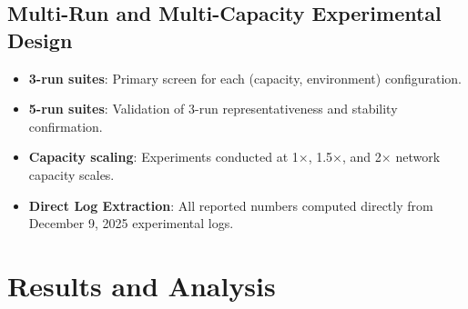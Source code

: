 \documentclass[12pt,a4paper]{article}
\begin{document}
\subsection{Multi-Run and Multi-Capacity Experimental Design}
\begin{itemize}
\item \textbf{3-run suites}: Primary screen for each (capacity, environment) configuration.
\item \textbf{5-run suites}: Validation of 3-run representativeness and stability confirmation.
\item \textbf{Capacity scaling}: Experiments conducted at 1$\times$, 1.5$\times$, and 2$\times$ network capacity scales.
\item \textbf{Direct Log Extraction}: All reported numbers computed directly from December 9, 2025 experimental logs.
\end{itemize}


\section{Results and Analysis}
\end{document}
